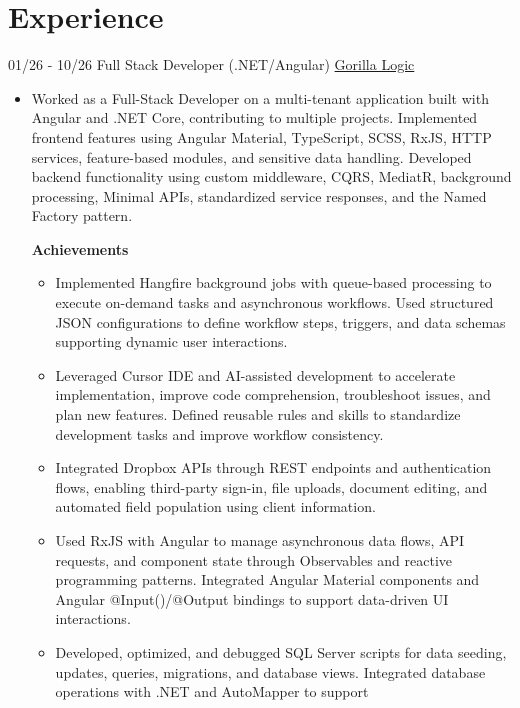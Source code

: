 \documentclass[letterpaper]{twentysecondcv} %
\begin{document}
\section{Experience}
    \begin{twenty}
        \twentyitem
        {01/26 - 10/26}
        {Full Stack Developer (.NET/Angular)}
        { \href{https://gorillalogic.com/}{Gorilla Logic} }
        {
            \begin{itemize}
                \item Worked as a Full-Stack Developer on a multi-tenant application built with Angular and .NET Core, contributing to multiple projects. Implemented frontend features using Angular Material, TypeScript, SCSS, RxJS, HTTP services, feature-based modules, and sensitive data handling. Developed backend functionality using custom middleware, CQRS, MediatR, background processing, Minimal APIs, standardized service responses, and the Named Factory pattern.

                \textbf{Achievements}
                \begin{itemize}
                    \item Implemented Hangfire background jobs with queue-based processing to execute on-demand tasks and asynchronous workflows. Used structured JSON configurations to define workflow steps, triggers, and data schemas supporting dynamic user interactions.
                    \item Leveraged Cursor IDE and AI-assisted development to accelerate
                    implementation, improve code comprehension, troubleshoot issues, and plan new features. Defined reusable rules and skills to standardize development tasks and improve workflow consistency.
                    \item Integrated Dropbox APIs through REST endpoints and authentication flows, enabling third-party sign-in, file uploads, document editing, and automated field population using client information.
                    \item Used RxJS with Angular to manage asynchronous data flows, API requests, and component state through Observables and reactive programming patterns. Integrated Angular Material components and Angular @Input()/@Output bindings to support data-driven UI interactions.
                    \item  Developed, optimized, and debugged SQL Server scripts for data seeding, updates, queries, migrations, and database views. Integrated database operations with .NET and AutoMapper to support
                \end{itemize}
            

\end{itemize}}
\end{twenty}
\end{document}
